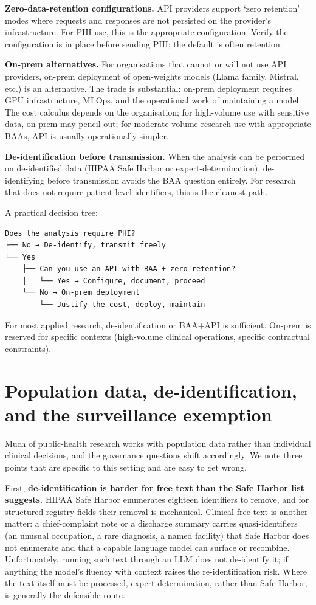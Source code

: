 \documentclass[
  letterpaper,
  11pt]{scrbook}
\begin{document}
\textbf{Zero-data-retention configurations.} API providers support `zero
retention' modes where requests and responses are not persisted on the
provider's infrastructure. For PHI use, this is the appropriate
configuration. Verify the configuration is in place before sending PHI;
the default is often retention.

\textbf{On-prem alternatives.} For organisations that cannot or will not
use API providers, on-prem deployment of open-weights models (Llama
family, Mistral, etc.) is an alternative. The trade is substantial:
on-prem deployment requires GPU infrastructure, MLOps, and the
operational work of maintaining a model. The cost calculus depends on
the organisation; for high-volume use with sensitive data, on-prem may
pencil out; for moderate-volume research use with appropriate BAAs, API
is usually operationally simpler.

\textbf{De-identification before transmission.} When the analysis can be
performed on de-identified data (HIPAA Safe Harbor or
expert-determination), de-identifying before transmission avoids the BAA
question entirely. For research that does not require patient-level
identifiers, this is the cleanest path.

A practical decision tree:

\begin{verbatim}
Does the analysis require PHI?
├── No → De-identify, transmit freely
└── Yes
    ├── Can you use an API with BAA + zero-retention?
    │   └── Yes → Configure, document, proceed
    └── No → On-prem deployment
        └── Justify the cost, deploy, maintain
\end{verbatim}

For most applied research, de-identification or BAA+API is sufficient.
On-prem is reserved for specific contexts (high-volume clinical
operations, specific contractual constraints).

\section{Population data, de-identification, and the surveillance
exemption}\label{population-data-de-identification-and-the-surveillance-exemption}

Much of public-health research works with population data rather than
individual clinical decisions, and the governance questions shift
accordingly. We note three points that are specific to this setting and
are easy to get wrong.

First, \textbf{de-identification is harder for free text than the Safe
Harbor list suggests.} HIPAA Safe Harbor enumerates eighteen identifiers
to remove, and for structured registry fields their removal is
mechanical. Clinical free text is another matter: a chief-complaint note
or a discharge summary carries quasi-identifiers (an unusual occupation,
a rare diagnosis, a named facility) that Safe Harbor does not enumerate
and that a capable language model can surface or recombine.
Unfortunately, running such text through an LLM does not de-identify it;
if anything the model's fluency with context raises the
re-identification risk. Where the text itself must be processed, expert
determination, rather than Safe Harbor, is generally the defensible
route.
\end{document}

